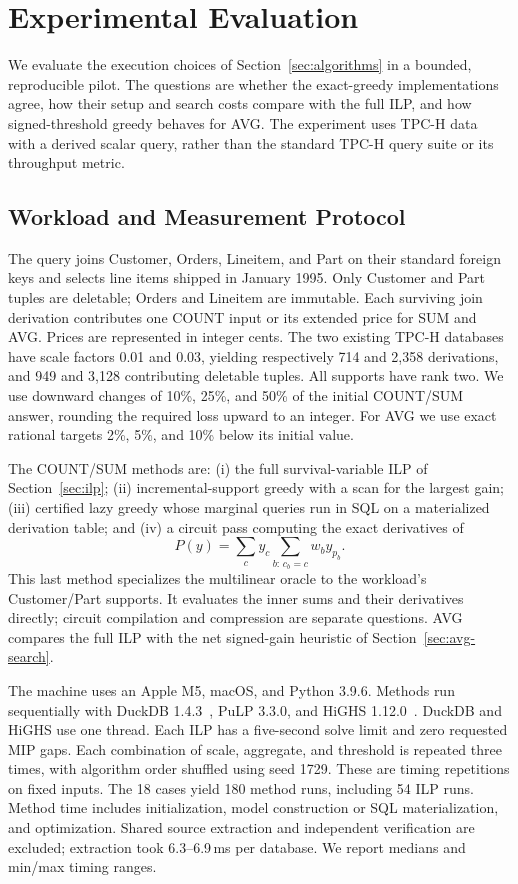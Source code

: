     \section{Experimental Evaluation}
\label{sec:experiments}

We evaluate the execution choices of Section~\ref{sec:algorithms} in a
bounded, reproducible pilot. The questions are whether the exact-greedy
implementations agree, how their setup and search costs compare with the
full ILP, and how signed-threshold greedy behaves for AVG. The experiment
uses TPC-H data~\cite{tpch} with a derived scalar query, rather than the
standard TPC-H query suite or its throughput metric.

\subsection{Workload and Measurement Protocol}

The query joins Customer, Orders, Lineitem, and Part on their standard
foreign keys and selects line items shipped in January 1995. Only Customer
and Part tuples are deletable; Orders and Lineitem are immutable. Each
surviving join derivation contributes one COUNT input or its extended price
for SUM and AVG. Prices are represented in integer cents. The two existing
TPC-H databases have scale factors 0.01 and 0.03, yielding respectively
714 and 2,358 derivations, and 949 and 3,128 contributing deletable tuples.
All supports have rank two. We use downward changes of 10\%, 25\%, and
50\% of the initial COUNT/SUM answer, rounding the required loss upward
to an integer. For AVG we use exact rational targets 2\%, 5\%, and 10\%
below its initial value.

The COUNT/SUM methods are: (i) the full survival-variable ILP of
Section~\ref{sec:ilp}; (ii) incremental-support greedy with a scan for the
largest gain; (iii) certified lazy greedy whose marginal queries run in
SQL on a materialized derivation table; and (iv) a circuit pass computing
the exact derivatives of
\[
P(y)=\sum_c y_c\sum_{b:\,c_b=c}w_b y_{p_b}.
\]
This last method specializes the multilinear oracle to the workload's
Customer/Part supports. It evaluates the inner sums and their derivatives
directly; circuit compilation and compression are separate questions.
AVG compares the full ILP with the net signed-gain heuristic of
Section~\ref{sec:avg-search}.

The machine uses an Apple M5, macOS, and Python 3.9.6. Methods run
sequentially with DuckDB 1.4.3~\cite{duckdb2019}, PuLP 3.3.0, and
HiGHS 1.12.0~\cite{highs}.
DuckDB and HiGHS use one thread. Each ILP has a five-second solve limit
and zero requested MIP gaps. Each combination of scale, aggregate, and threshold is repeated
three times, with algorithm order shuffled using seed 1729.
These are timing repetitions on fixed inputs. The 18 cases yield 180
method runs, including 54 ILP runs. Method time includes initialization,
model construction or SQL materialization, and optimization. Shared
source extraction and independent verification are excluded; extraction
took 6.3--6.9\,ms per database. We report medians and min/max timing ranges.

